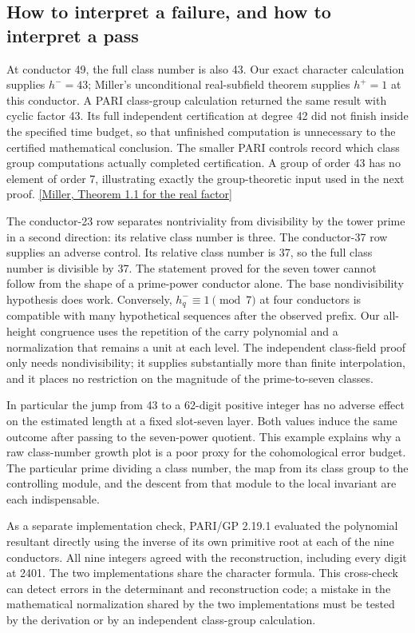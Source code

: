 \documentclass[12pt,letterpaper]{article}
\begin{document}
\subsection{How to interpret a failure, and how to interpret a pass}
At conductor 49, the full class number is also 43. Our exact character calculation supplies \(h^-=43\); Miller's unconditional real-subfield theorem supplies \(h^+=1\) at this conductor. A PARI class-group calculation returned the same result with cyclic factor 43. Its full independent certification at degree 42 did not finish inside the specified time budget, so that unfinished computation is unnecessary to the certified mathematical conclusion. The smaller PARI controls record which class group computations actually completed certification. A group of order 43 has no element of order 7, illustrating exactly the group-theoretic input used in the next proof. \href{https://doi.org/10.1112/S1461157014000382}{[Miller, Theorem 1.1 for the real factor]}

The conductor-23 row separates nontriviality from divisibility by the tower prime in a second direction: its relative class number is three. The conductor-37 row supplies an adverse control. Its relative class number is 37, so the full class number is divisible by 37. The statement proved for the seven tower cannot follow from the shape of a prime-power conductor alone. The base nondivisibility hypothesis does work. Conversely, \(h_q^-\equiv1\pmod7\) at four conductors is compatible with many hypothetical sequences after the observed prefix. Our all-height congruence uses the repetition of the carry polynomial and a normalization that remains a unit at each level. The independent class-field proof only needs nondivisibility; it supplies substantially more than finite interpolation, and it places no restriction on the magnitude of the prime-to-seven classes.

In particular the jump from 43 to a 62-digit positive integer has no adverse effect on the estimated length at a fixed slot-seven layer. Both values induce the same outcome after passing to the seven-power quotient. This example explains why a raw class-number growth plot is a poor proxy for the cohomological error budget. The particular prime dividing a class number, the map from its class group to the controlling module, and the descent from that module to the local invariant are each indispensable.

As a separate implementation check, PARI/GP 2.19.1 evaluated the polynomial resultant directly using the inverse of its own primitive root at each of the nine conductors. All nine integers agreed with the reconstruction, including every digit at 2401. The two implementations share the character formula. This cross-check can detect errors in the determinant and reconstruction code; a mistake in the mathematical normalization shared by the two implementations must be tested by the derivation or by an independent class-group calculation.
\end{document}
